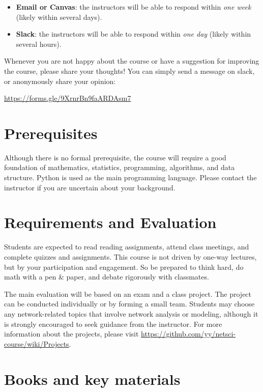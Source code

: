 \documentclass[11pt,article,oneside]{memoir} %
\begin{document}
\begin{itemize}
\item \textbf{Email or Canvas}: the instructors will be able to respond within \emph{one week} (likely within several days).
\item \textbf{Slack}: the instructors will be able to respond within \emph{one day} (likely within several hours).

\end{itemize}

Whenever you are not happy about the course or have a suggestion for improving the course, please share your thoughts! You can simply send a message on slack, or anonymously share your opinion:

\url{https://forms.gle/9XrnrBn9faARDAsm7}

\section{Prerequisites} %

Although there is no formal prerequisite, the course will require a good foundation of mathematics, statistics, programming, algorithms, and data structure. 
Python is used as the main programming language. 
Please contact the instructor if you are uncertain about your background.

\section{Requirements and Evaluation} %

Students are expected to read reading assignments, attend class meetings, and complete quizzes and assignments. 
This course is not driven by one-way lectures, but by your participation and engagement.
So be prepared to think hard, do math with a pen \& paper, and debate rigorously with classmates. 

The main evaluation will be based on an exam and a class project.
The project can be conducted individually or by forming a small team.
Students may choose any network-related topics that involve network analysis or modeling, although it is strongly encouraged to seek guidance from the instructor.
For more information about the projects, please visit \url{https://github.com/yy/netsci-course/wiki/Projects}.

\section{Books and key materials} %
\end{document}
